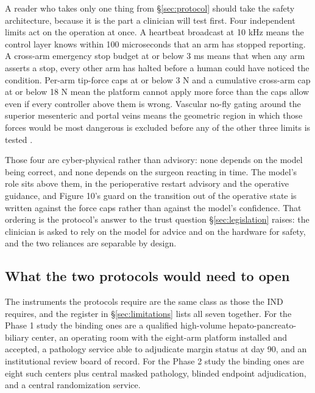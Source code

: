 A reader who takes only one thing from \S\ref{sec:protocol} should take the
safety architecture, because it is the part a clinician will test first. Four
independent limits act on the operation at once. A heartbeat broadcast at 10 kHz
means the control layer knows within 100 microseconds that an arm has stopped
reporting. A cross-arm emergency stop budget at or below 3 ms means that when
any arm asserts a stop, every other arm has halted before a human could have
noticed the condition. Per-arm tip-force caps at or below 3 N and a cumulative
cross-arm cap at or below 18 N mean the platform cannot apply more force than
the caps allow even if every controller above them is wrong. Vascular no-fly
gating around the superior mesenteric and portal veins means the geometric
region in which those forces would be most dangerous is excluded before any of
the other three limits is tested \cite{onpremwhippl}.

Those four are cyber-physical rather than advisory: none depends on the model
being correct, and none depends on the surgeon reacting in time. The model's
role sits above them, in the perioperative restart advisory and the operative
guidance, and Figure 10's guard on the transition out of the operative state is
written against the force caps rather than against the model's confidence. That
ordering is the protocol's answer to the trust question \S\ref{sec:legislation}
raises: the clinician is asked to rely on the model for advice and on the
hardware for safety, and the two reliances are separable by design.

\subsection{What the two protocols would need to open}

The instruments the protocols require are the same class as those the IND
requires, and the register in \S\ref{sec:limitations} lists all seven together.
For the Phase 1 study the binding ones are a qualified high-volume
hepato-pancreato-biliary center, an operating room with the eight-arm platform
installed and accepted, a pathology service able to adjudicate margin status at
day 90, and an institutional review board of record. For the Phase 2 study the
binding ones are eight such centers plus central masked pathology, blinded
endpoint adjudication, and a central randomization service.

